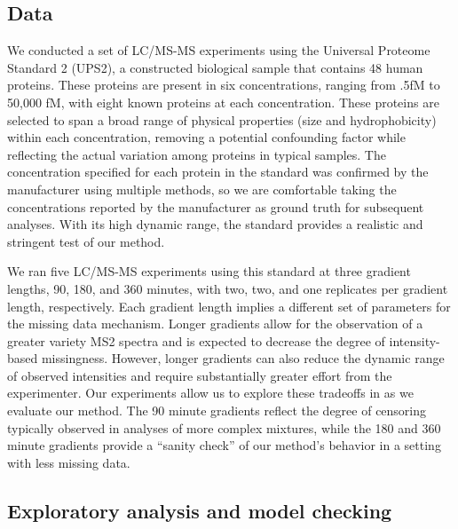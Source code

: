 
\subsection{Data}
\label{proteomics:sec:data}

We conducted a set of LC/MS-MS experiments using the Universal Proteome Standard 2 (UPS2), a constructed biological sample that contains 48 human proteins.
These proteins are present in six concentrations, ranging from .5fM to 50,000 fM, with eight known proteins at each concentration.
These proteins are selected to span a broad range of physical properties (size and hydrophobicity) within each concentration, removing a potential confounding factor while reflecting the actual variation among proteins in typical samples.
The concentration specified for each protein in the standard was confirmed by the manufacturer using multiple methods, so we are comfortable taking the concentrations reported by the manufacturer as ground truth for subsequent analyses.
With its high dynamic range, the standard provides a realistic and stringent test of our method.

We ran five LC/MS-MS experiments using this standard at three gradient lengths, 90, 180, and 360 minutes, with two, two, and one replicates per gradient length, respectively.
Each gradient length implies a different set of parameters for the missing data mechanism.
Longer gradients allow for the observation of a greater variety MS2 spectra and is expected to decrease the degree of intensity-based missingness.
However, longer gradients can also reduce the dynamic range of observed intensities and require substantially greater effort from the experimenter.
Our experiments allow us to explore these tradeoffs in as we evaluate our method.
The 90 minute gradients reflect the degree of censoring typically observed in analyses of more complex mixtures, while the 180 and 360 minute gradients provide a ``sanity check'' of our method's behavior in a setting with less missing data.


\subsection{Exploratory analysis and model checking}
\label{proteomics:sec:checkassumptions}

